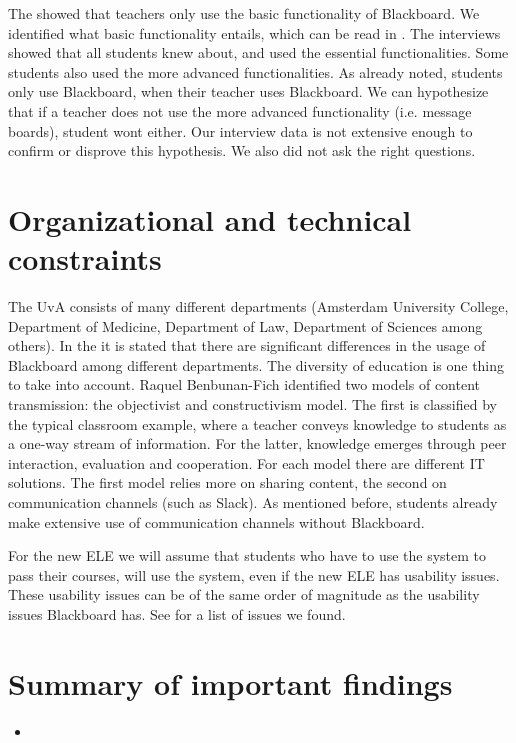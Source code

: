 The \rreport showed that teachers only use the basic functionality of Blackboard. We identified what basic functionality entails, which can be read in . The interviews showed that all students knew about, and used the essential functionalities. Some students also used the more advanced functionalities. As already noted, students only use Blackboard, when their teacher uses Blackboard. We can hypothesize that if a teacher does not use the more advanced functionality (i.e. message boards), student wont either. Our interview data is not extensive enough to confirm or disprove this hypothesis. We also did not ask the right questions. 

\section{Organizational and technical constraints}
The UvA consists of many different departments (Amsterdam University College, Department of Medicine, Department of Law, Department of Sciences among others). In the \rreport it is stated that there are significant differences in the usage of Blackboard among different departments. The diversity of education is one thing to take into account. Raquel Benbunan-Fich \cite{improveEducationWithIt} identified two models of content transmission: the objectivist and constructivism model. The first is classified by the typical classroom example, where a teacher conveys knowledge to students as a one-way stream of information. For the latter, knowledge emerges through peer interaction, evaluation and cooperation. For each model there are different IT solutions. The first model relies more on sharing content, the second on communication channels (such as Slack). As mentioned before, students already make extensive use of communication channels without Blackboard. \\

For the new ELE we will assume that students who have to use the system to pass their courses, will use the system, even if the new ELE has usability issues. These usability issues can be of the same order of magnitude as the usability issues Blackboard has. See  for a list of issues we found. 

\section{Summary of important findings}
\begin{itemize}
	\item 
\end{itemize}


